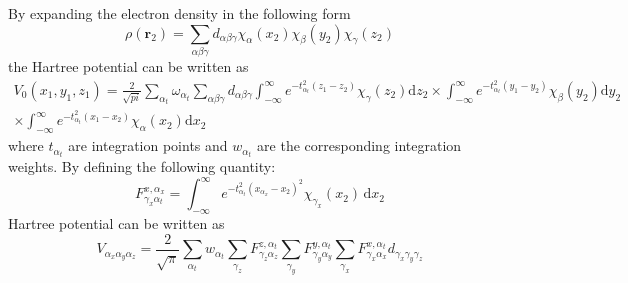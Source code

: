 By expanding the electron density in the following form
\begin{equation}
\rho(\mathbf{r}_2) = \sum_{\alpha\beta\gamma} d_{\alpha\beta\gamma}
\chi_{\alpha}(x_2) \chi_{\beta}(y_2) \chi_{\gamma}(z_2)
\end{equation}
the Hartree potential can be written as
\begin{multline}
V_{0}(x_{1},y_{1},z_{1}) = \frac{2}{\sqrt{pi}}\sum_{\alpha_t} \omega_{\alpha_t}
\sum_{\alpha\beta\gamma} d_{\alpha\beta\gamma}
\int_{-\infty}^{\infty} e^{-t^2_{\alpha_t}(z_{1} - z_{2}) } \chi_{\gamma}(z_2)\mathrm{d}z_2
\times \int_{-\infty}^{\infty} e^{-t^2_{\alpha_t}(y_{1} - y_{2}) } \chi_{\beta}(y_2)\mathrm{d}y_2 \\
\times \int_{-\infty}^{\infty} e^{-t^2_{\alpha_t}(x_{1} - x_{2}) } \chi_{\alpha}(x_2)\mathrm{d}x_2
\end{multline}
where
$t_{\alpha_t}$ are integration points and $w_{\alpha_t}$ are the corresponding
integration weights.
By defining the following quantity:
\begin{equation}
F_{\gamma_x \alpha_t}^{x,\alpha_x} = \int_{-\infty}^{\infty}
e^{-t^2_{\alpha_t} (x_{\alpha_x} - x_2)^2} \chi_{\gamma_x}(x_2)\,\mathrm{d}x_2
\end{equation}
Hartree potential can be written as
\begin{equation}
V_{\alpha_x \alpha_y \alpha_z} = \frac{2}{\sqrt{\pi}} \sum_{\alpha_t} w_{\alpha_t}
\sum_{\gamma_z} F_{\gamma_z \alpha_z}^{z,\alpha_t}
\sum_{\gamma_y} F_{\gamma_y \alpha_y}^{y,\alpha_t}
\sum_{\gamma_x} F_{\gamma_x \alpha_x}^{x,\alpha_t}
d_{\gamma_x \gamma_y \gamma_z}
\end{equation}



